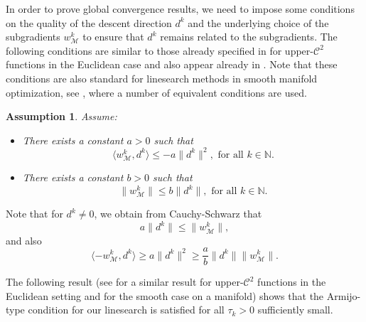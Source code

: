 \documentclass[a4paper, 12pt]{article}
\numberwithin{equation}{section}
\theoremstyle{bolddef}
\newtheorem{assumption}[definition]{Assumption}
\theoremstyle{definition}
\theoremstyle{boldplain}
\newcommand{\wk}{w^k}
\newcommand{\dk}{d^k}
\begin{document}
In order to prove global convergence results, we need to impose some
conditions on the quality of the descent direction $ d^k $ and the 
underlying choice of the subgradients $ w_\mathcal{M}^k $ to ensure that $d^k$ remains related to the subgradients. The following conditions are similar to those already specified in \cite{aragon2025} for upper-$\mathcal{C}^2$ functions in the Euclidean case and also appear already in \cite{ZhangHager2004}. Note that these conditions are also standard for linesearch methods in smooth manifold optimization, see \cite{Boumal2018, Oviedo2022, Qian2024}, where a number of equivalent conditions are used.

\begin{assumption}\label{genas}
Assume:
\begin{itemize}
	\item[(a)] There exists a constant $a > 0$ such that 
		\begin{equation}\label{eq:wdbound1}
			\langle \wk_\mathcal{M}, \dk\rangle \leq - a \|\dk\|^2, \text{ for all } k \in \mathbb{N}.
		\end{equation}
	\item[(b)] There exists a constant $b >0$ such that
		\begin{equation}\label{eq:wdbound2}
			\|\wk_\mathcal{M}\| \leq b \|\dk\|, \text{ for all } k \in \mathbb{N}.
		\end{equation}
\end{itemize}
\end{assumption}
Note that for $\dk \neq 0$, we obtain from Cauchy-Schwarz that
\begin{equation}\label{eq:wdbound3}
	a \| \dk \| \leq \|\wk_\mathcal{M}\|,
\end{equation}
and also
\begin{equation}\label{eq:wdbound4}
	\langle -\wk_\mathcal{M}, \dk \rangle \geq a \| \dk\|^2 \geq \frac{a}{b} \|\dk\|\|\wk_\mathcal{M}\|.
\end{equation}

The following result (see \cite[Proposition 4.3]{aragon2025} for a similar result for upper-$\mathcal{C}^2$ functions in the Euclidean setting and \cite[Lemma 2.10]{Boumal2018} for the smooth case on a manifold) shows that the Armijo-type condition for our linesearch is satisfied for all $ \tau_k > 0 $ sufficiently small.
\end{document}
